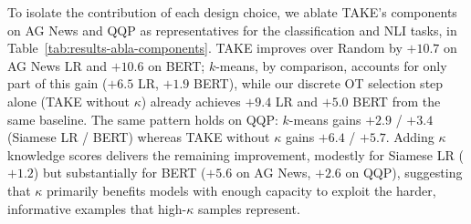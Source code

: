\begin{foldable} %
  To isolate the contribution of each design choice, we ablate TAKE's components on AG News and QQP as representatives for the classification and NLI tasks, in Table~\ref{tab:results-abla-components}.
  TAKE improves over Random by $+10.7$ on AG News LR and $+10.6$ on BERT; $k$-means, by comparison, accounts for only part of this gain ($+6.5$ LR, $+1.9$ BERT), while our discrete OT selection step alone (TAKE without $\kappa$) already achieves $+9.4$ LR and $+5.0$ BERT from the same baseline.
  The same pattern holds on QQP: $k$-means gains $+2.9$ / $+3.4$ (Siamese LR / BERT) whereas TAKE without $\kappa$ gains $+6.4$ / $+5.7$.
  Adding $\kappa$ knowledge scores delivers the remaining improvement, modestly for Siamese LR ($+1.2$) but substantially for BERT ($+5.6$ on AG News, $+2.6$ on QQP), suggesting that $\kappa$ primarily benefits models with enough capacity to exploit the harder, informative examples that high-$\kappa$ samples represent.
\end{foldable}

